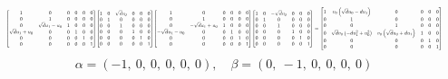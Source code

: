 \documentclass[11pt]{article}
\theoremstyle{definition}
\begin{document}
\[
\scaletoalign{\textwidth}{{\left[\begin{matrix}1 & 0 & 0 & 0 & 0 & 0\\0 & 1 & 0 & 0 & 0 & 0\\0 & \sqrt{d} u_{1} - u_{0} & 1 & 0 & 0 & 0\\\sqrt{d} u_{1} + u_{0} & 0 & 0 & 1 & 0 & 0\\0 & 0 & 0 & 0 & 1 & 0\\0 & 0 & 0 & 0 & 0 & 1\end{matrix}\right]} {\left[\begin{matrix}1 & 0 & \sqrt{d} v_{0} & 0 & 0 & 0\\0 & 1 & 0 & 0 & 0 & 0\\0 & 0 & 1 & 0 & 0 & 0\\0 & 0 & 0 & 1 & 0 & 0\\0 & 0 & 0 & 0 & 1 & 0\\0 & 0 & 0 & 0 & 0 & 1\end{matrix}\right]} {\left[\begin{matrix}1 & 0 & 0 & 0 & 0 & 0\\0 & 1 & 0 & 0 & 0 & 0\\0 & - \sqrt{d} u_{1} + u_{0} & 1 & 0 & 0 & 0\\- \sqrt{d} u_{1} - u_{0} & 0 & 0 & 1 & 0 & 0\\0 & 0 & 0 & 0 & 1 & 0\\0 & 0 & 0 & 0 & 0 & 1\end{matrix}\right]} {\left[\begin{matrix}1 & 0 & - \sqrt{d} v_{0} & 0 & 0 & 0\\0 & 1 & 0 & 0 & 0 & 0\\0 & 0 & 1 & 0 & 0 & 0\\0 & 0 & 0 & 1 & 0 & 0\\0 & 0 & 0 & 0 & 1 & 0\\0 & 0 & 0 & 0 & 0 & 1\end{matrix}\right]} = {\left[\begin{matrix}1 & v_{0} \left(\sqrt{d} u_{0} - d u_{1}\right) & 0 & 0 & 0 & 0\\0 & 1 & 0 & 0 & 0 & 0\\0 & 0 & 1 & 0 & 0 & 0\\0 & \sqrt{d} v_{0} \left(- d u_{1}^{2} + u_{0}^{2}\right) & v_{0} \left(\sqrt{d} u_{0} + d u_{1}\right) & 1 & 0 & 0\\0 & 0 & 0 & 0 & 1 & 0\\0 & 0 & 0 & 0 & 0 & 1\end{matrix}\right]}}
\]
\[
\alpha = \left( -1, \  0, \  0, \  0, \  0, \  0\right), \quad \beta = \left( 0, \  -1, \  0, \  0, \  0, \  0\right)
\]
\end{document}

